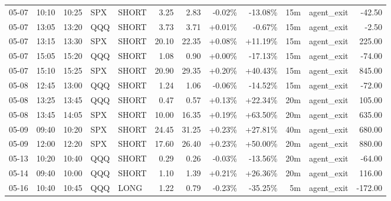 \documentclass[11pt,a4paper]{article}
\begin{document}
\begin{center}
\begin{longtable}{>{\color{txtmain}}l l l l l r r r r r >{\color{txtmain}}l r}
05-07 & 10:10 & 10:25 & SPX & SHORT & 3.25 & 2.83 & \textcolor{lossred}{-0.02\%} & \textcolor{lossred}{-13.08\%} & 15m & agent\_exit & \textcolor{lossred}{-42.50} \\
05-07 & 13:05 & 13:20 & QQQ & SHORT & 3.73 & 3.71 & \textcolor{wingreen}{+0.01\%} & \textcolor{lossred}{-0.67\%} & 15m & agent\_exit & \textcolor{lossred}{-2.50} \\
05-07 & 13:15 & 13:30 & SPX & SHORT & 20.10 & 22.35 & \textcolor{wingreen}{+0.08\%} & \textcolor{wingreen}{+11.19\%} & 15m & agent\_exit & \textcolor{wingreen}{225.00} \\
05-07 & 15:05 & 15:20 & QQQ & SHORT & 1.08 & 0.90 & \textcolor{wingreen}{+0.00\%} & \textcolor{lossred}{-17.13\%} & 15m & agent\_exit & \textcolor{lossred}{-74.00} \\
05-07 & 15:10 & 15:25 & SPX & SHORT & 20.90 & 29.35 & \textcolor{wingreen}{+0.20\%} & \textcolor{wingreen}{+40.43\%} & 15m & agent\_exit & \textcolor{wingreen}{845.00} \\
05-08 & 12:45 & 13:00 & QQQ & SHORT & 1.24 & 1.06 & \textcolor{lossred}{-0.06\%} & \textcolor{lossred}{-14.52\%} & 15m & agent\_exit & \textcolor{lossred}{-72.00} \\
05-08 & 13:25 & 13:45 & QQQ & SHORT & 0.47 & 0.57 & \textcolor{wingreen}{+0.13\%} & \textcolor{wingreen}{+22.34\%} & 20m & agent\_exit & \textcolor{wingreen}{105.00} \\
05-08 & 13:45 & 14:05 & SPX & SHORT & 10.00 & 16.35 & \textcolor{wingreen}{+0.19\%} & \textcolor{wingreen}{+63.50\%} & 20m & agent\_exit & \textcolor{wingreen}{635.00} \\
05-09 & 09:40 & 10:20 & SPX & SHORT & 24.45 & 31.25 & \textcolor{wingreen}{+0.23\%} & \textcolor{wingreen}{+27.81\%} & 40m & agent\_exit & \textcolor{wingreen}{680.00} \\
05-09 & 12:00 & 12:20 & SPX & SHORT & 17.60 & 26.40 & \textcolor{wingreen}{+0.23\%} & \textcolor{wingreen}{+50.00\%} & 20m & agent\_exit & \textcolor{wingreen}{880.00} \\
05-13 & 10:20 & 10:40 & QQQ & SHORT & 0.29 & 0.26 & \textcolor{lossred}{-0.03\%} & \textcolor{lossred}{-13.56\%} & 20m & agent\_exit & \textcolor{lossred}{-64.00} \\
05-14 & 09:40 & 10:00 & QQQ & SHORT & 1.10 & 1.39 & \textcolor{wingreen}{+0.21\%} & \textcolor{wingreen}{+26.36\%} & 20m & agent\_exit & \textcolor{wingreen}{116.00} \\
05-16 & 10:40 & 10:45 & QQQ & LONG & 1.22 & 0.79 & \textcolor{lossred}{-0.23\%} & \textcolor{lossred}{-35.25\%} & 5m & agent\_exit & \textcolor{lossred}{-172.00} \\

\end{longtable}
\end{center}
\end{document}
